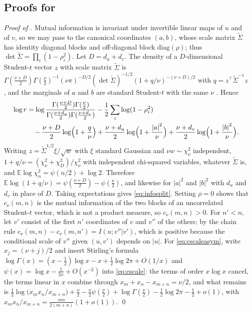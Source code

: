 \documentclass[11pt]{article}
\theoremstyle{plain}
\theoremstyle{definition}
\theoremstyle{remark}
\newcommand{\E}{\mathbb{E}}
\newcommand{\abs}[1]{\left\lvert #1 \right\rvert}
\begin{document}
\subsection{Proofs for \texorpdfstring{}{Section 4.4}}
\label{app:dimension}
\emph{Proof of .}
Mutual information is invariant under invertible linear maps of $u$ and of
$v$, so we may pass to the canonical coordinates $(a,b)$, whose scale matrix
$\tilde\Sigma$ has identity diagonal blocks and off-diagonal block
$\mathrm{diag}(\rho)$; thus $\det\tilde\Sigma=\prod_i(1-\rho_i^{2})$. Let
$D=d_u+d_v$. The density of a $D$-dimensional Student-$t$ vector $z$ with
scale matrix $\tilde\Sigma$ is
$\Gamma(\tfrac{\nu+D}{2})\Gamma(\tfrac\nu2)^{-1}(\nu\pi)^{-D/2}(\det\tilde\Sigma)^{-1/2}(1+q/\nu)^{-(\nu+D)/2}$
with $q=z^{\top}\tilde\Sigma^{-1}z$, and the marginals of $a$ and $b$ are
standard Student-$t$ with the same $\nu$ \cite{kotz2004multivariate}. Hence
\begin{align*}
 \log r & =\log\frac{\Gamma(\frac{\nu+D}{2})\Gamma(\frac\nu2)}{\Gamma(\frac{\nu+d_u}{2})\Gamma(\frac{\nu+d_v}{2})}
 -\frac12\sum_i\log(1-\rho_i^{2})                                                                                  \\
        & \quad-\frac{\nu+D}{2}\log\Bigl(1+\frac q\nu\Bigr)
 +\frac{\nu+d_u}{2}\log\Bigl(1+\frac{\abs{a}^{2}}{\nu}\Bigr)
 +\frac{\nu+d_v}{2}\log\Bigl(1+\frac{\abs{b}^{2}}{\nu}\Bigr).
\end{align*}
Writing $z=\tilde\Sigma^{1/2}\xi/\sqrt{w}$ with $\xi$ standard Gaussian and
$\nu w\sim\chi^{2}_{\nu}$ independent, $1+q/\nu=(\chi^{2}_{\nu}+\chi^{2}_{D})/\chi^{2}_{\nu}$
with independent chi-squared variables, whatever $\tilde\Sigma$ is, and
$\E\log\chi^{2}_{n}=\psi(n/2)+\log2$. Therefore
$\E\log(1+q/\nu)=\psi(\tfrac{\nu+D}{2})-\psi(\tfrac\nu2)$, and likewise for
$\abs{a}^{2}$ and $\abs{b}^{2}$ with $d_u$ and $d_v$ in place of $D$. Taking
expectations gives \eqref{eq:infosplit}. Setting $\rho=0$ shows that
$c_\nu(m,n)$ is the mutual information of the two blocks of an uncorrelated
Student-$t$ vector, which is not a product measure, so $c_\nu(m,n)>0$. For
$n'<n$, let $v'$ consist of the first $n'$ coordinates of $v$ and $v''$ of
the others; by the chain rule
$c_\nu(m,n)-c_\nu(m,n')=I(u;v''\vert v')$, which is positive because the
conditional scale of $v''$ given $(u,v')$ depends on $\abs{u}$. For
\eqref{eq:cscaleasym}, write $x_j=(\nu+j)/2$ and insert Stirling's formula
$\log\Gamma(x)=(x-\tfrac12)\log x-x+\tfrac12\log2\pi+O(1/x)$ and
$\psi(x)=\log x-\tfrac1{2x}+O(x^{-2})$ into \eqref{eq:cscale}: the terms of
order $x\log x$ cancel, the terms linear in $x$ combine through
$x_m+x_n-x_{m+n}=\nu/2$, and what remains is
$\tfrac12\log\bigl(x_mx_n/x_{m+n}\bigr)+\tfrac\nu2-\tfrac\nu2\psi(\tfrac\nu2)+\log\Gamma(\tfrac\nu2)-\tfrac12\log2\pi-\tfrac12+o(1)$,
with $x_mx_n/x_{m+n}=\tfrac{mn}{2(m+n)}(1+o(1))$.
\qed
\end{document}
